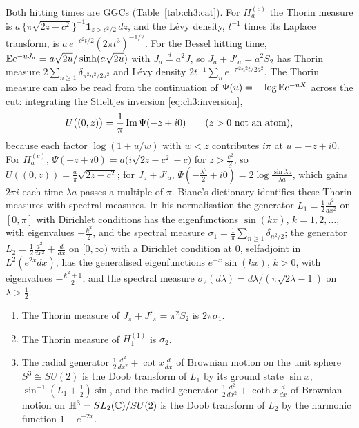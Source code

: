 Both hitting times are GGCs (Table~\ref{tab:ch3:cat}). For $H^{(c)}_a$ the Thorin measure is $a\,\{\pi\sqrt{2z-c^2}\}^{-1}\mathbf 1_{z>c^2/2}\,dz$, and the L\'evy density, $t^{-1}$ times its Laplace transform, is $a\,e^{-c^2t/2}(2\pi t^3)^{-1/2}$. For the Bessel hitting time, $\mathbb{E} e^{-uJ_a}=a\sqrt{2u}/\sinh(a\sqrt{2u})$ with $J_a\overset d=a^2J$, so $J_a+J'_a=a^2S_2$ has Thorin measure $2\sum_{n\ge1}\delta_{\pi^2n^2/2a^2}$ and L\'evy density $2t^{-1}\sum_ne^{-\pi^2n^2t/2a^2}$. The Thorin measure can also be read from the continuation of $\Psi(u)=-\log\mathbb{E} e^{-uX}$ across the cut: integrating the Stieltjes inversion \eqref{eq:ch3:inversion},
\[
U\big((0,z)\big)=\frac1\pi\operatorname{Im}\Psi(-z+i0)\qquad(z>0\text{ not an atom}),
\]
because each factor $\log(1+u/w)$ with $w<z$ contributes $i\pi$ at $u=-z+i0$. For $H^{(c)}_a$, $\Psi(-z+i0)=a\big(i\sqrt{2z-c^2}-c\big)$ for $z>\frac{c^2}2$, so $U((0,z))=\frac a\pi\sqrt{2z-c^2}$; for $J_a+J'_a$, $\Psi(-\frac{\lambda^2}2+i0)=2\log\frac{\sin\lambda a}{\lambda a}$, which gains $2\pi i$ each time $\lambda a$ passes a multiple of $\pi$. Biane's dictionary identifies these Thorin measures with spectral measures. In his normalisation \cite[(2.1) to (2.3)]{Biane09} the generator $L_1=\frac12\frac{d^2}{dx^2}$ on $[0,\pi]$ with Dirichlet conditions has the eigenfunctions $\sin(kx)$, $k=1,2,\dots$, with eigenvalues $-\frac{k^2}2$, and the spectral measure $\sigma_1=\frac1\pi\sum_{n\ge1}\delta_{n^2/2}$; the generator $L_2=\frac12\frac{d^2}{dx^2}+\frac d{dx}$ on $[0,\infty)$ with a Dirichlet condition at $0$, selfadjoint in $L^2(e^{2x}dx)$, has the generalised eigenfunctions $e^{-x}\sin(kx)$, $k>0$, with eigenvalues $-\frac{k^2+1}2$, and the spectral measure $\sigma_2(d\lambda)=d\lambda/(\pi\sqrt{2\lambda-1})$ on $\lambda>\frac12$.

\begin{theorem}\label{thm:biane:dict}
\begin{enumerate}
\item[(i)] The Thorin measure of $J_\pi+J'_\pi=\pi^2S_2$ is $2\pi\sigma_1$.
\item[(ii)] The Thorin measure of $H^{(1)}_1$ is $\sigma_2$.
\item[(iii)] The radial generator $\frac12\frac{d^2}{dx^2}+\cot x\frac d{dx}$ of Brownian motion on the unit sphere $S^3\cong SU(2)$ is the Doob transform of $L_1$ by its ground state $\sin x$, $\sin^{-1}(L_1+\frac12)\sin$, and the radial generator $\frac12\frac{d^2}{dx^2}+\coth x\frac d{dx}$ of Brownian motion on $\mathbb H^3=SL_2(\mathbb{C})/SU(2)$ is the Doob transform of $L_2$ by the harmonic function $1-e^{-2x}$.
\end{enumerate}
\end{theorem}

